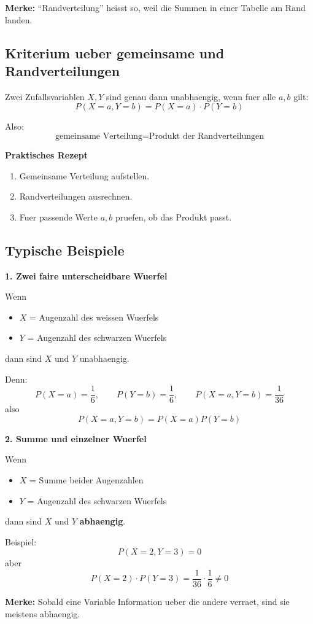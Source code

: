 \documentclass[a4paper,11pt]{article}
\begin{document}
\textbf{Merke:}
``Randverteilung'' heisst so, weil die Summen in einer Tabelle am Rand landen.

\subsection{Kriterium ueber gemeinsame und Randverteilungen}
Zwei Zufallsvariablen $X,Y$ sind genau dann unabhaengig, wenn fuer alle $a,b$ gilt:
\[
P(X=a,Y=b)=P(X=a)\cdot P(Y=b)
\]

Also:
\[
\text{gemeinsame Verteilung} = \text{Produkt der Randverteilungen}
\]

\textbf{Praktisches Rezept}
\begin{enumerate}
  \item Gemeinsame Verteilung aufstellen.
  \item Randverteilungen ausrechnen.
  \item Fuer passende Werte $a,b$ pruefen, ob das Produkt passt.
\end{enumerate}

\subsection{Typische Beispiele}
\textbf{1. Zwei faire unterscheidbare Wuerfel}

Wenn
\begin{itemize}
  \item $X$ = Augenzahl des weissen Wuerfels
  \item $Y$ = Augenzahl des schwarzen Wuerfels
\end{itemize}
dann sind $X$ und $Y$ unabhaengig.

Denn:
\[
P(X=a)=\frac16,\qquad P(Y=b)=\frac16,\qquad P(X=a,Y=b)=\frac1{36}
\]
also
\[
P(X=a,Y=b)=P(X=a)P(Y=b)
\]

\textbf{2. Summe und einzelner Wuerfel}

Wenn
\begin{itemize}
  \item $X$ = Summe beider Augenzahlen
  \item $Y$ = Augenzahl des schwarzen Wuerfels
\end{itemize}
dann sind $X$ und $Y$ \textbf{abhaengig}.

Beispiel:
\[
P(X=2,Y=3)=0
\]
aber
\[
P(X=2)\cdot P(Y=3)=\frac1{36}\cdot\frac16 \neq 0
\]

\textbf{Merke:}
Sobald eine Variable Information ueber die andere verraet, sind sie meistens abhaengig.
\end{document}
